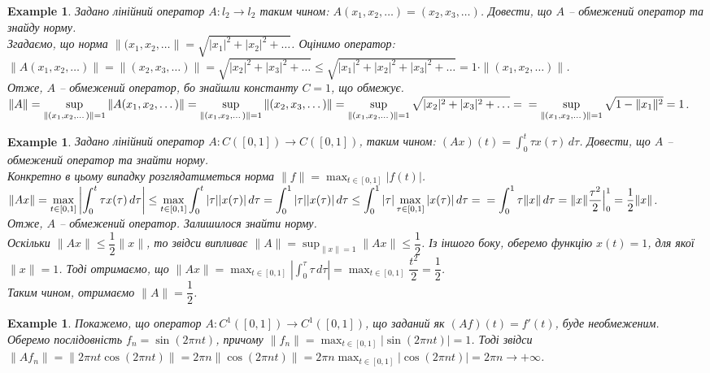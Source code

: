 \documentclass[a4paper, 10pt]{article}
\theoremstyle{theoremdd}
\theoremstyle{theoremdd}
\theoremstyle{theoremdd}
\theoremstyle{theoremdd}
\newtheorem{example}[theorem]{Example}
\theoremstyle{theoremdd}
\theoremstyle{theoremdd}
\theoremstyle{theoremdd}
\theoremstyle{theoremdd}
\begin{document}
\begin{example}
Задано лінійний оператор $A \colon l_2 \to l_2$ таким чином: $A(x_1,x_2,\dots) = (x_2,x_3,\dots)$. Довести, що $A$ -- обмежений оператор та знайду норму.\\
Згадаємо, що норма $\|(x_1,x_2,\dots\| = \sqrt{|x_1|^2 + |x_2|^2 + \dots}$. Оцінимо оператор:\\
$\|A (x_1,x_2,\dots)\| = \|(x_2,x_3,\dots)\| = \sqrt{|x_2|^2 + |x_3|^2 + \dots} \leq \sqrt{|x_1|^2 + |x_2|^2 + |x_3|^2 + \dots} = 1 \cdot \|(x_1,x_2,\dots)\|$.\\
Отже, $A$ -- обмежений оператор, бо знайшли константу $C = 1$, що обмежує.\\
$\|A\| = \displaystyle\sup_{\|(x_1,x_2,\dots)\| = 1} \|A(x_1,x_2,\dots)\| = \displaystyle\sup_{\|(x_1,x_2,\dots)\| = 1} \|(x_2,x_3,\dots)\| = \sup_{\|(x_1,x_2,\dots)\| = 1} \sqrt{|x_2|^2 + |x_3|^2 + \dots} = \\
= \sup_{\|(x_1,x_2,\dots)\| = 1} \sqrt{1 - \|x_1\|^2} = 1$.
\end{example}

\begin{example}
Задано лінійний оператор $A \colon C([0,1]) \to C([0,1])$, таким чином: $(Ax)(t) = \displaystyle\int_0^t \tau x(\tau)\,d\tau$. Довести, що $A$ -- обмежений оператор та знайти норму.\\
Конкретно в цьому випадку розглядатиметься норма $\|f\| = \displaystyle\max_{t \in [0,1]} |f(t)|$.\\
$\displaystyle\|Ax\| = \max_{t \in [0,1]} \left| \int_0^t \tau x(\tau)\,d\tau \right| \leq \max_{t \in [0,1]} \int_0^t |\tau| |x(\tau)|\,d\tau = \int_0^1 |\tau| |x(\tau)|\,d\tau \leq \int_0^1 |\tau| \max_{\tau \in [0,1]} |x(\tau)|\,d\tau = \\
= \int_0^1 \tau \|x \|\,d\tau = \|x\| \dfrac{\tau^2}{2} \Big|_0^1 = \dfrac{1}{2} \|x\|$.\\
Отже, $A$ -- обмежений оператор. Залишилося знайти норму.\\
Оскільки $\|Ax\| \leq \dfrac{1}{2} \|x\|$, то звідси випливає $\|A\| = \displaystyle\sup_{\|x\| = 1} \|Ax\| \leq \dfrac{1}{2}$. Із іншого боку, оберемо функцію $x(t) = 1$, для якої $\|x\| = 1$. Тоді отримаємо, що $\|Ax\| = \displaystyle\max_{t \in [0,1]} \left|\int_0^\tau \tau\,d\tau\right| = \max_{t \in [0,1]} \dfrac{t^2}{2} = \dfrac{1}{2}$.\\
Таким чином, отримаємо $\|A\| = \dfrac{1}{2}$.
\end{example}

\begin{example}
Покажемо, що оператор $A \colon C^1([0,1]) \to C^1([0,1])$, що заданий як $(Af)(t) = f'(t)$, буде необмеженим.\\
Оберемо послідовність $f_n = \sin (2\pi n t)$, причому $\|f_n\| = \displaystyle\max_{t \in [0,1]} |\sin (2\pi n t)| = 1$. Тоді звідси\\
$\|Af_n\| = \displaystyle \| 2\pi n t \cos (2\pi n t)\| = 2 \pi n \| \cos (2\pi n t)\| = 2 \pi n \max_{t \in [0,1]} |\cos (2\pi n t)| = 2 \pi n \to +\infty$.
\end{example}
\end{document}
